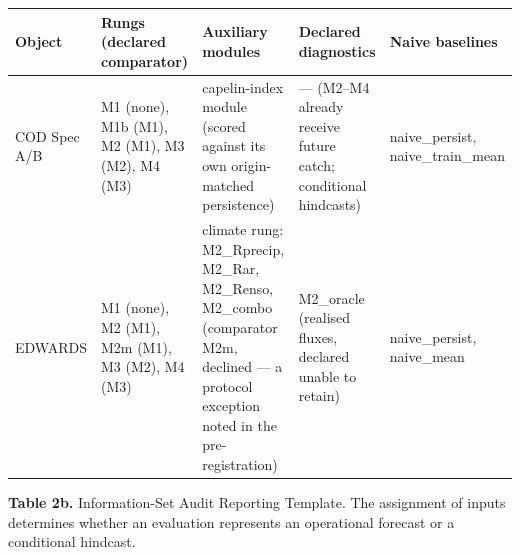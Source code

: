 \documentclass[11pt]{article}
\begin{document}
{\def\LTcaptype{none} %
\begin{longtable}[]{@{}
  >{\raggedright\arraybackslash}p{}
  >{\raggedright\arraybackslash}p{}
  >{\raggedright\arraybackslash}p{}
  >{\raggedright\arraybackslash}p{}
  >{\raggedright\arraybackslash}p{}@{}}
\toprule\noalign{}
\begin{minipage}[b]{\linewidth}\raggedright
Object
\end{minipage} & \begin{minipage}[b]{\linewidth}\raggedright
Rungs (declared comparator)
\end{minipage} & \begin{minipage}[b]{\linewidth}\raggedright
Auxiliary modules
\end{minipage} & \begin{minipage}[b]{\linewidth}\raggedright
Declared diagnostics
\end{minipage} & \begin{minipage}[b]{\linewidth}\raggedright
Naive baselines
\end{minipage} \\
\midrule\noalign{}
\endhead
\bottomrule\noalign{}
\endlastfoot
COD Spec A/B & M1 (none), M1b (M1), M2 (M1), M3 (M2), M4 (M3) &
capelin-index module (scored against its own origin-matched persistence)
& --- (M2--M4 already receive future catch; conditional hindcasts) &
naive\_persist, naive\_train\_mean \\
EDWARDS & M1 (none), M2 (M1), M2m (M1), M3 (M2), M4 (M3) & climate rung:
M2\_Rprecip, M2\_Rar, M2\_Renso, M2\_combo (comparator M2m, declined ---
a protocol exception noted in the pre-registration) & M2\_oracle
(realised fluxes, declared unable to retain) & naive\_persist,
naive\_mean \\
\end{longtable}
}

\textbf{Table 2b.} Information-Set Audit Reporting Template. The
assignment of inputs determines whether an evaluation represents an
operational forecast or a conditional hindcast.
\end{document}
